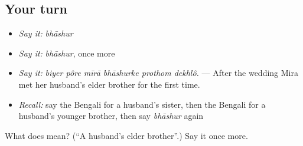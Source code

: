\subsection*{Your turn}
\begin{itemize}
\raggedright
  \item \emph{Say it:} \emph{bhāshur}
  \item \emph{Say it:} \emph{bhāshur}, once more
  \item \emph{Say it:} \emph{biyer pôre mīrā bhāshurke prothom dekhlô.} — After the wedding Mira met her husband's elder brother for the first time.
  \item \emph{Recall:} say the Bengali for a husband's sister, then the Bengali for a husband's younger brother, then say \emph{bhāshur} again
\end{itemize}

\begin{tcolorbox}[breakable,colback=teal!4,colframe=teal!35!black,title={Before you move on}]
What does  mean? (\textquotedblleft{}A husband's elder brother\textquotedblright{}.) Say it once more.
\end{tcolorbox}
